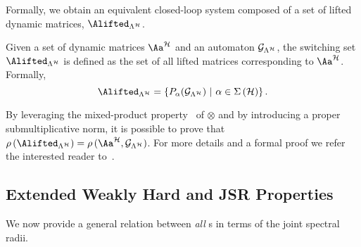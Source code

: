 %
Formally, we obtain an equivalent closed-loop system composed of a set of lifted dynamic matrices, $\Alifted_{\Lambda^\strat}$.
%
\begin{definition}%
    \label{def:switching_set}%
    Given a set of dynamic matrices $\Aa^{\strat}$ and an automaton $\mathcal{G}_{\Lambda^{\mathcal{H}}}$, the switching set $\Alifted_{\Lambda^\strat}$ is defined as the set of all lifted matrices corresponding to $\Aa^{\strat}$.
    Formally,
    \begin{equation*}
        \Alifted_{\Lambda^\strat} = \left\{ P_{\alpha} ( \GG{\Lambda^\strat} ) \,\, | \,\, \alpha \in \Sigma\left(\strat\right) \right\}.
    \end{equation*}
\end{definition}
%
By leveraging the mixed-product property~\cite{horn2012matrix} of $\otimes$ and by introducing a proper submultiplicative norm, it is possible to prove that $\rho\left(\Alifted_{\Lambda^\strat}\right)= \rho\,(\Aa^{\strat},\GG{\Lambda^\strat})$.
For more details and a formal proof we refer the interested reader to~\cite{xu2020approximation}.


\subsection{Extended Weakly Hard and JSR Properties}
\label{sec:analytic_results}
%
We now provide a general relation between \emph{all} \ewhc{}s in terms of the joint spectral radii.

